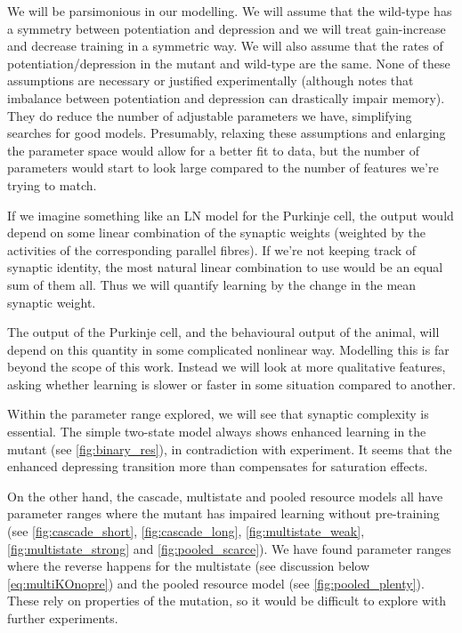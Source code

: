 \documentclass[12pt]{article}
\begin{document}
We will be parsimonious in our modelling.
We will assume that the wild-type has a symmetry between potentiation and depression and we will treat gain-increase and decrease training in a symmetric way.
We will also assume that the rates of potentiation/depression in the mutant and wild-type are the same.
None of these assumptions are necessary or justified experimentally (although \cite{Fusi2007multistate} notes that imbalance between potentiation and depression can drastically impair memory).
They do reduce the number of adjustable parameters we have, simplifying searches for good models.
Presumably, relaxing these assumptions and enlarging the parameter space would allow for a better fit to data, but the number of parameters would start to look large compared to the number of features we're trying to match.

If we imagine something like an LN model for the Purkinje cell, the output would depend on some linear combination of the synaptic weights (weighted by the activities of the corresponding parallel fibres).
If we're not keeping track of synaptic identity, the most natural linear combination to use would be an equal sum of them all.
Thus we will quantify learning by the change in the mean synaptic weight.

The output of the Purkinje cell, and the behavioural output of the animal, will depend on this quantity in some complicated nonlinear way.
Modelling this is far beyond the scope of this work.
Instead we will look at more qualitative features, asking whether learning is slower or faster in some situation compared to another.

Within the parameter range explored, we will see that synaptic complexity is essential.
The simple two-state model always shows enhanced learning in the mutant (see \autoref{fig:binary_res}), in contradiction with experiment.
It seems that the enhanced depressing transition more than compensates for saturation effects.

On the other hand, the cascade, multistate and pooled resource models all have parameter ranges where the mutant has impaired learning without pre-training (see \autoref{fig:cascade_short}, \autoref{fig:cascade_long}, \autoref{fig:multistate_weak}, \autoref{fig:multistate_strong} and \autoref{fig:pooled_scarce}).
We have found parameter ranges where the reverse happens for the multistate (see discussion below \eqref{eq:multiKOnopre}) and the pooled resource model (see \autoref{fig:pooled_plenty}).
These rely on properties of the mutation, so it would be difficult to explore with further experiments.
\end{document}
